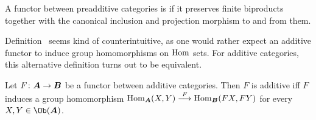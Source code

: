 \documentclass[a4paper,parskip=half,numbers=enddot, DIV=12]{scrreprt}
\begin{document}
\begin{defi}
	A functor between preadditive categories is  if it preserves finite biproducts together with the canonical inclusion and projection morphism to and from them.
\end{defi}
\begin{rem*}
	Definition~ seems kind of counterintuitive, as one would rather expect an additive functor to induce group homomorphisms on $\operatorname{Hom}$ sets. For additive categories, this alternative definition turns out to be equivalent.
\end{rem*}
\begin{prop}
	Let $F\colon {\cat A}\morphism{\cat B}$ be a functor between additive categories. Then $F$ is additive iff $F$ induces a group homomorphism $\Hom_{\cat A}(X,Y)\morphism[F]\Hom_{\cat B}(FX,FY)$ for every $X,Y\in\Ob({\cat A})$.
\end{prop}
\end{document}
